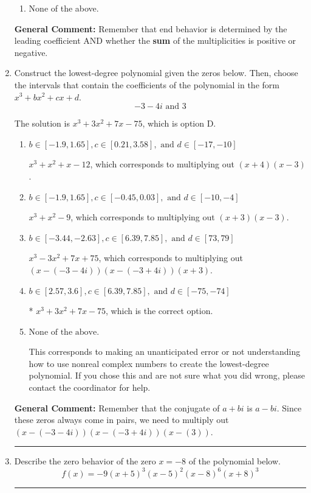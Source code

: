 \documentclass{extbook}[14pt]
\newcommand{\litem}[1]{\item #1

\rule{\textwidth}{0.4pt}}
\begin{document}
\begin{enumerate}
{\begin{enumerate}[label=\Alph*.]
\begin{multicols}{2}
\end{multicols}\item None of the above.\end{enumerate}
\textbf{General Comment:} Remember that end behavior is determined by the leading coefficient AND whether the \textbf{sum} of the multiplicities is positive or negative.
}
\litem{
Construct the lowest-degree polynomial given the zeros below. Then, choose the intervals that contain the coefficients of the polynomial in the form $x^3+bx^2+cx+d$.
\[ -3 - 4 i \text{ and } 3 \]

The solution is \( x^{3} +3 x^{2} +7 x -75 \), which is option D.\begin{enumerate}[label=\Alph*.]
\item \( b \in [-1.9, 1.65], c \in [0.21, 3.58], \text{ and } d \in [-17, -10] \)

$x^{3} + x^{2} +x -12$, which corresponds to multiplying out $(x + 4)(x -3)$.
\item \( b \in [-1.9, 1.65], c \in [-0.45, 0.03], \text{ and } d \in [-10, -4] \)

$x^{3} + x^{2} -9$, which corresponds to multiplying out $(x + 3)(x -3)$.
\item \( b \in [-3.44, -2.63], c \in [6.39, 7.85], \text{ and } d \in [73, 79] \)

$x^{3} -3 x^{2} +7 x + 75$, which corresponds to multiplying out $(x-(-3 - 4 i))(x-(-3 + 4 i))(x + 3)$.
\item \( b \in [2.57, 3.6], c \in [6.39, 7.85], \text{ and } d \in [-75, -74] \)

* $x^{3} +3 x^{2} +7 x -75$, which is the correct option.
\item \( \text{None of the above.} \)

This corresponds to making an unanticipated error or not understanding how to use nonreal complex numbers to create the lowest-degree polynomial. If you chose this and are not sure what you did wrong, please contact the coordinator for help.
\end{enumerate}

\textbf{General Comment:} Remember that the conjugate of $a+bi$ is $a-bi$. Since these zeros always come in pairs, we need to multiply out $(x-(-3 - 4 i))(x-(-3 + 4 i))(x-(3))$.
}
\litem{
Describe the zero behavior of the zero $x = -8$ of the polynomial below.
\[ f(x) = -9(x + 5)^{3}(x - 5)^{2}(x - 8)^{6}(x + 8)^{3} \]

}
\end{enumerate}
\end{document}
